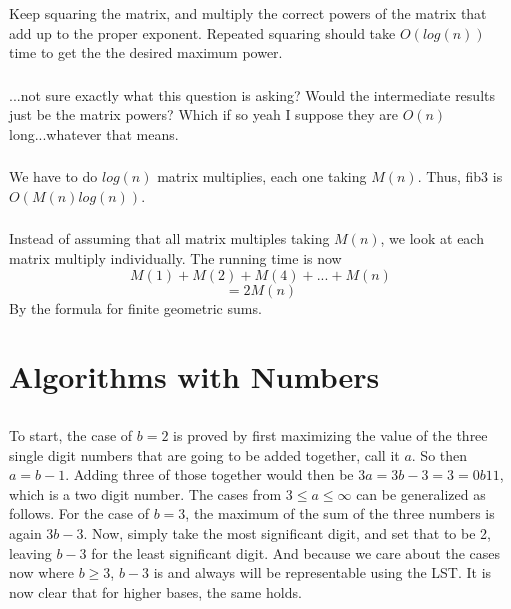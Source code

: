 \documentclass{article}
\begin{document}
\subsubsection{}Keep squaring the matrix, and multiply the correct powers of the matrix that add up to the proper exponent. Repeated squaring should take $O(log(n))$ time to get the the desired maximum power.
\subsubsection{}...not sure exactly what this question is asking? Would the intermediate results just be the matrix powers? Which if so yeah I suppose they are $O(n)$ long...whatever that means. 
\subsubsection{}We have to do $log(n)$ matrix multiplies, each one taking $M(n)$. Thus, fib3 is $O(M(n)log(n))$.
\subsubsection{}Instead of assuming that all matrix multiples taking $M(n)$, we look at each matrix multiply individually. The running time is now $$M(1)+M(2)+M(4)+...+M(n)$$
$$=2M(n)$$
By the formula for finite geometric sums. 
\section{Algorithms with Numbers}
\subsection{} To start, the case of $b=2$ is proved by first maximizing the value of the three single digit numbers that are going to be added together, call it $a$. So then $a=b-1$. Adding three of those together would then be $3a=3b-3=3=0b11$, which is a two digit number. The cases from $3 \leq a \leq \infty$ can be generalized as follows. For the case of $b=3$, the maximum of the sum of the three numbers is again $3b-3$. Now, simply take the most significant digit, and set that to be 2, leaving $b-3$ for the least significant digit. And because we care about the cases now where $b \geq 3$, $b-3$ is and always will be representable using the LST. It is now clear that for higher bases, the same holds. 
\end{document}
